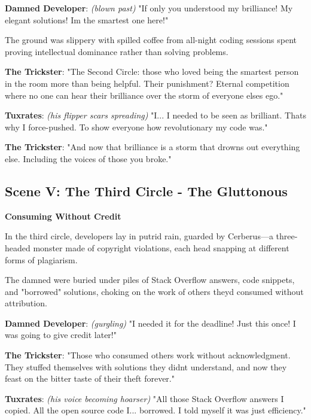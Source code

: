 \textbf{Damned Developer}: \emph{(blown past)} "If only you understood my brilliance! My elegant solutions! I\textquotesingle m the smartest one here!"

The ground was slippery with spilled coffee from all-night coding sessions spent proving intellectual dominance rather than solving problems.

\textbf{The Trickster}: "The Second Circle: those who loved being the smartest person in the room more than being helpful. Their punishment? Eternal competition where no one can hear their brilliance over the storm of everyone else\textquotesingle s ego."

\textbf{Tuxrates}: \emph{(his flipper scars spreading)} "I... I needed to be seen as brilliant. That\textquotesingle s why I force-pushed. To show everyone how revolutionary my code was."

\textbf{The Trickster}: "And now that brilliance is a storm that drowns out everything else. Including the voices of those you broke."

\bookdivider

\subsection{Scene V: The Third Circle - The Gluttonous}\label{scene-v-the-third-circle---the-gluttonous}

\textbf{Consuming Without Credit}

In the third circle, developers lay in putrid rain, guarded by Cerberus---a three-headed monster made of copyright violations, each head snapping at different forms of plagiarism.

The damned were buried under piles of Stack Overflow answers, code snippets, and "borrowed" solutions, choking on the work of others they\textquotesingle d consumed without attribution.

\textbf{Damned Developer}: \emph{(gurgling)} "I needed it for the deadline! Just this once! I was going to give credit later!"

\textbf{The Trickster}: "Those who consumed others\textquotesingle{} work without acknowledgment. They stuffed themselves with solutions they didn\textquotesingle t understand, and now they feast on the bitter taste of their theft forever."

\textbf{Tuxrates}: \emph{(his voice becoming hoarser)} "All those Stack Overflow answers I copied. All the open source code I... borrowed. I told myself it was just efficiency."

